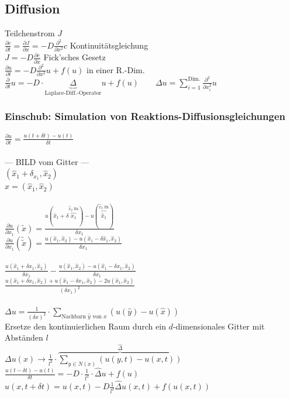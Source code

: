 \subsection{Diffusion}
Teilchenstrom $J$ \\
$ \frac{\partial c}{\partial t} = \frac{\partial J}{\partial x} = -D \frac{\partial^2}{\partial x^2} c $ \qquad Kontinuitätsgleichung \\  %
$ J = -D \frac{\partial c}{\partial x} $ \qquad Fick'sches Gesetz \\
$ \frac{\partial u}{\partial t} = - D \frac{\partial^2}{\partial x^2} u + f(u) $ \qquad in einer R.-Dim. \\
$ \frac{\partial}{\partial t} u = -D \cdot \underbrace{\Delta}_{\text{Laplace-Diff.-Operator}} u  + f(u) \qquad \Delta u = \sum\limits_{i=1}^{\text{Dim.}} \frac{\partial^2}{\partial x_i^2} u $

\subsubsection{Einschub: Simulation von Reaktions-Diffusionsgleichungen}
$ \frac{\partial u}{\partial t} = \frac{u(t + \delta t) - u(t)}{\delta t} $ \\\\
--- BILD vom Gitter ---\\
$ (\hat{x}_1 + \delta_{x_1}, \hat{x}_2) $ \\
$ \hat{x} = (\hat{x}_1, \hat{x}_2) $ \\\\
$ \frac{\partial u}{\partial x_1}(\tilde{x}) = \frac{u(\hat{x}_1 + \delta \overbrace{x_1}^{\hat{x}_2 \text{ fix}}) - u(\overbrace{\hat{x}_1}^{\hat{x}_2 \text{ fix}})}{\delta x_1} $ \\
$ \frac{\partial u}{\partial x_1}(\tilde{\tilde{x}}) = \frac{u(\hat{x}_1, \hat{x}_2) - u(\hat{x}_1 - \delta \hat{x}_1, \hat{x}_2)}{\delta x_1} $ \\\\
$ \frac{u(\hat{x}_1 + \delta x_1, \hat{x}_2)}{\delta x_1} - \frac{u(\hat{x}_1, \hat{x}_2) - u(\hat{x}_1 - \delta x_1, \hat{x}_2)}{\delta x_1} $ \\
$ \frac{u(\hat{x}_1 + \delta x_1, \hat{x}_2) + u(\hat{x}_1 - \delta x_1, \hat{x}_2) - 2u(\hat{x}_1, \hat{x}_2)}{(\delta x_1)^2} $ \\\\
$ \Delta u = \frac{1}{(\delta x)^2} \cdot \sum\limits_{\text{Nachbarn } \hat{y} \text{ von }x}(u(\hat{y}) - u(\hat{x})) $ \\
Ersetze den kontinuierlichen Raum durch ein $d$-dimensionales Gitter mit Abständen $l$ \\
$ \Delta u(x) \rightarrow \frac{1}{l^2} \cdot \overbrace{\sum\limits_{y \in N(x)}(u(y, t) - u(x, t))}^{\hat{\Delta}} $ \\
$ \frac{u(t - \delta t) - u(t)}{\delta t} = -D \cdot \frac{1}{l^2} \cdot \hat{\Delta} u + f(u) $ \\
$ u(x, t + \delta t) = u(x, t) -D \frac{1}{l^2} \hat{\Delta} u(x, t) + f(u(x, t)) $ \\
